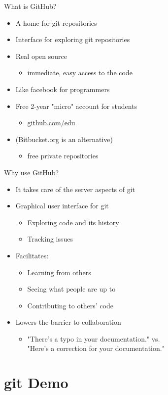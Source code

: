 \documentclass[12pt,t]{beamer}
\newcommand{\bi}{\begin{itemize}}
\newcommand{\bbi}{\vspace{24pt} \begin{itemize} \itemsep8pt}
\newcommand{\ei}{\end{itemize}}
\begin{document}
\begin{frame}{What is GitHub?}
\bbi
\item A home for git repositories
\item Interface for exploring git repositories
\item {\color{hilit} Real} open source
\bi
\item immediate, easy access to the code
\ei
\item Like facebook for programmers
\item Free 2-year "micro" account for students
\bi
\item \href{http://education.github.com}{github.com/edu}
\ei
\item (Bitbucket.org is an alternative)
\bi
\item free private repositories
\ei
\ei

\note{
}
\end{frame}

\begin{frame}{Why use GitHub?}
\bbi
\item It takes care of the server aspects of git
\item Graphical user interface for git
\bi
\item Exploring code and its history
\item Tracking issues
\ei
\item Facilitates:
\bi
\item Learning from others
\item Seeing what people are up to
\item Contributing to others' code
\ei
\item Lowers the barrier to collaboration
\bi
\item "There's a typo in your documentation." vs. \\
"Here's a correction for your documentation."
\ei
\ei

\note{
}
\end{frame}



\section{git Demo}
\end{document}
